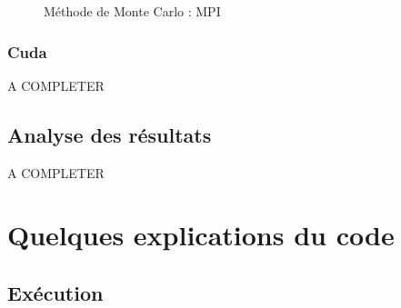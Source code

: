 \documentclass[10pt,a4paper]{article}
\begin{document}
\begin{figure}[H]
    \centering

    \hfill %
  
    \caption{Méthode de Monte Carlo : MPI}
    \label{fig:MCMPI}
  \end{figure}

\subsubsection{Cuda}

A COMPLETER


\subsection{Analyse des résultats} \label{sec:analyse}

A COMPLETER

\section{Quelques explications du code}


\subsection{Exécution}
\end{document}
